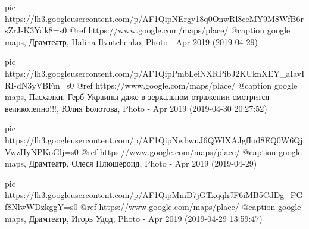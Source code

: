      pic https://lh3.googleusercontent.com/p/AF1QipNErgy18q0OnwRl8ceMY9M8WfB6rsZrJ-K3Ydk8=s0
     @ref https://www.google.com/maps/place/%
     @caption google maps, Драмтеатр, Halina Ilvutchenko, Photo - Apr 2019 (2019-04-29)

     pic https://lh3.googleusercontent.com/p/AF1QipPmbLeiNXRPibJ2KUknXEY_aIavIRI-dN3yVBFm=s0
     @ref https://www.google.com/maps/place/%
     @caption google maps, Пасхалки. Герб Украины даже в зеркальном отражении смотрится великолепно!!!, Юлия Болотова, Photo - Apr 2019 (2019-04-30 20:27:52)

     pic https://lh3.googleusercontent.com/p/AF1QipNwbwuJ6QWlXAJgfIod8EQ0W6QjVwzHyNPKoGlj=s0
     @ref https://www.google.com/maps/place/%
     @caption google maps, Драмтеатр, Олеся Плющероид, Photo - Apr 2019 (2019-04-29)

     pic https://lh3.googleusercontent.com/p/AF1QipMmD7jGTxqqhJF6iMB5CdDg_PGf8NlwWDzkggY=s0
     @ref https://www.google.com/maps/place/%
     @caption google maps, Драмтеатр, Игорь Удод, Photo - Apr 2019 (2019-04-29 13:59:47)

